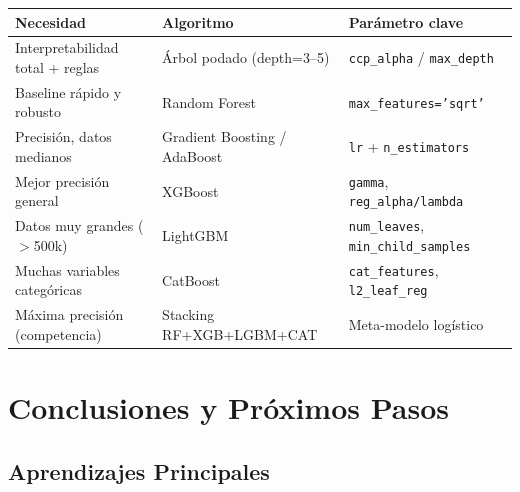 \documentclass[11pt, a4paper]{book}
\begin{document}
\begin{center}
  \begin{tabular}{lll}
    \toprule
    \textbf{Necesidad} & \textbf{Algoritmo} & \textbf{Parámetro clave}\\
    \midrule
    Interpretabilidad total + reglas & Árbol podado (depth=3--5) & \texttt{ccp\_alpha} / \texttt{max\_depth}\\
    Baseline rápido y robusto & Random Forest & \texttt{max\_features='sqrt'}\\
    Precisión, datos medianos & Gradient Boosting / AdaBoost & \texttt{lr} + \texttt{n\_estimators}\\
    Mejor precisión general & XGBoost & \texttt{gamma}, \texttt{reg\_alpha/lambda}\\
    Datos muy grandes ($>$500k) & LightGBM & \texttt{num\_leaves}, \texttt{min\_child\_samples}\\
    Muchas variables categóricas & CatBoost & \texttt{cat\_features}, \texttt{l2\_leaf\_reg}\\
    Máxima precisión (competencia) & Stacking RF+XGB+LGBM+CAT & Meta-modelo logístico\\
    \bottomrule
  \end{tabular}
\end{center}

\chapter{Conclusiones y Próximos Pasos}

\section{Aprendizajes Principales}
\end{document}
